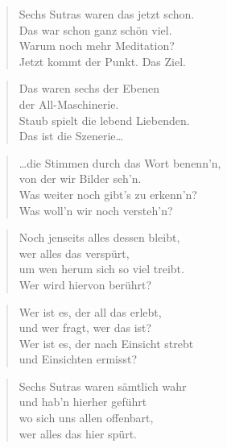 \documentclass[10pt,a4paper]{article}
\begin{document}
\begin{multicols}{2}


\begin{verse}
Sechs Sutras waren das jetzt schon. \\
Das war schon ganz schön viel. \\
Warum noch mehr Meditation? \\
Jetzt kommt der Punkt. Das Ziel. \\
\end{verse}

\begin{verse}
Das waren sechs der Ebenen \\
der All-Maschinerie. \\
Staub spielt die lebend Liebenden. \\
Das ist die Szenerie… \\
\end{verse}

\begin{verse}
…die Stimmen durch das Wort benenn’n, \\
von der wir Bilder seh’n. \\
Was weiter noch gibt’s zu erkenn’n? \\
Was woll’n wir noch versteh’n? \\
\end{verse}

\begin{verse}
Noch jenseits alles dessen bleibt, \\
wer alles das verspürt, \\
um wen herum sich so viel treibt. \\
Wer wird hiervon berührt? \\
\end{verse}

\begin{verse}
Wer ist es, der all das erlebt, \\
und wer fragt, wer das ist? \\
Wer ist es, der nach Einsicht strebt \\
und Einsichten ermisst? \\
\end{verse}

\begin{verse}
Sechs Sutras waren sämtlich wahr \\
und hab’n hierher geführt \\
wo sich uns allen offenbart, \\
wer alles das hier spürt. \\
\end{verse}


\end{multicols}
\end{document}
